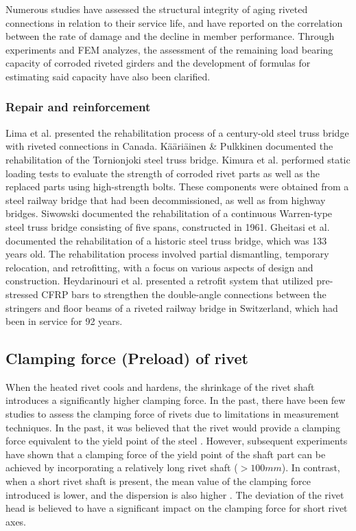 Numerous studies\cite{imam2008,Ryoichi2013,1987163,hisanori1991} have assessed the structural integrity of aging riveted connections in relation to their service life, and have reported on the correlation between the rate of damage and the decline in member performance. Through experiments and FEM analyzes\cite{nakata2016, Yurika2019,chen2022jp,cheniabse2022,Pipinato2014ResidualApproach,Bertolesi2021FatigueApproach}, the assessment of the remaining load bearing capacity of corroded riveted girders and the development of formulas for estimating said capacity have also been clarified. 

\subsubsection{Repair and reinforcement}
Lima et al.\cite{lima2008} presented the rehabilitation process of a century-old steel truss bridge with riveted connections in Canada. Kääriäinen \& Pulkkinen \cite{kaaria2002} documented the rehabilitation of the Tornionjoki steel truss bridge. Kimura et al.\cite{kimura2009} performed static loading tests to evaluate the strength of corroded rivet parts as well as the replaced parts using high-strength bolts. These components were obtained from a steel railway bridge that had been decommissioned, as well as from highway bridges. Siwowski \cite{siwowski2013} documented the rehabilitation of a continuous Warren-type steel truss bridge consisting of five spans, constructed in 1961. Gheitasi et al. \cite{Gheitasi2022} documented the rehabilitation of a historic steel truss bridge, which was 133 years old. The rehabilitation process involved partial dismantling, temporary relocation, and retrofitting, with a focus on various aspects of design and construction. Heydarinouri et al. \cite{Heydarinouri2021} presented a retrofit system that utilized pre-stressed CFRP bars to strengthen the double-angle connections between the stringers and floor beams of a riveted railway bridge in Switzerland, which had been in service for 92 years.

\subsection{Clamping force (Preload) of rivet}

When the heated rivet cools and hardens, the shrinkage of the rivet shaft introduces a significantly higher clamping force. In the past, there have been few studies to assess the clamping force of rivets due to limitations in measurement techniques. In the past, it was believed that the rivet would provide a clamping force equivalent to the yield point of the steel \cite{VanMaarschalkerwaart1982FatigueJoints}. However, subsequent experiments have shown that a clamping force of the yield point of the shaft part can be achieved by incorporating a relatively long rivet shaft ($>100 mm$). In contrast, when a short rivet shaft is present, the mean value of the clamping force introduced is lower, and the dispersion is also higher \cite{Zhou1994FatigueMembers, Baron1953TheJoints}. The deviation of the rivet head is believed to have a significant impact on the clamping force for short rivet axes.

